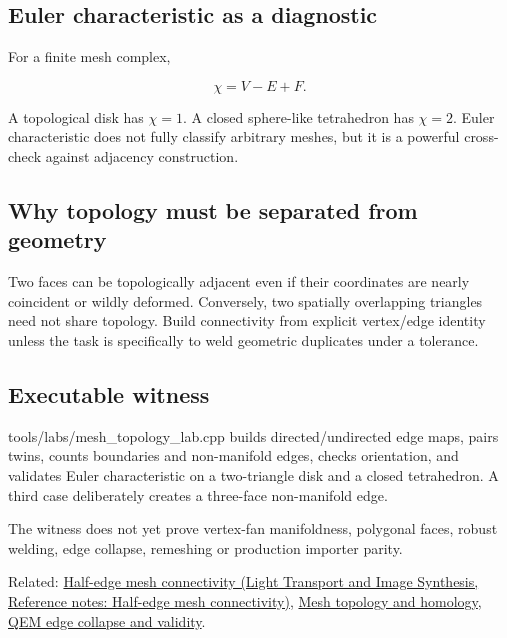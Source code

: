 \subsection{Euler characteristic as a diagnostic}\label{appendix-faac749c9cdd-euler-characteristic-as-a-diagnostic}

For a finite mesh complex,

\[
\chi = V-E+F.
\]

A topological disk has \(\chi=1\). A closed sphere-like tetrahedron has \(\chi=2\). Euler characteristic does not fully classify arbitrary meshes, but it is a powerful cross-check against adjacency construction.

\subsection{Why topology must be separated from geometry}\label{appendix-faac749c9cdd-why-topology-must-be-separated-from-geometry}

Two faces can be topologically adjacent even if their coordinates are nearly coincident or wildly deformed. Conversely, two spatially overlapping triangles need not share topology. Build connectivity from explicit vertex/edge identity unless the task is specifically to weld geometric duplicates under a tolerance.

\subsection{Executable witness}\label{appendix-faac749c9cdd-executable-witness}

tools/labs/mesh\_topology\_lab.cpp builds directed/undirected edge maps, pairs twins, counts boundaries and non-manifold edges, checks orientation, and validates Euler characteristic on a two-triangle disk and a closed tetrahedron. A third case deliberately creates a three-face non-manifold edge.

The witness does not yet prove vertex-fan manifoldness, polygonal faces, robust welding, edge collapse, remeshing or production importer parity.

Related: \href{../04-Light-Transport-and-Image-Synthesis/main.pdf\#nameddest=appendix-1aea26b2307f}{Half-edge mesh connectivity (Light Transport and Image Synthesis, Reference notes: Half-edge mesh connectivity)}, \hyperref[appendix-e38976cbbf86]{Mesh topology and homology}, \hyperref[appendix-89db9fe1bc8a]{QEM edge collapse and validity}.
